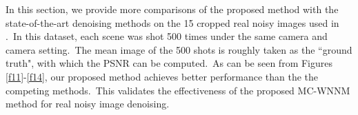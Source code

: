 \documentclass[10pt,onecolumn,letterpaper]{article}
\begin{document}
In this section, we provide more comparisons of the proposed method with the state-of-the-art denoising methods on the 15 cropped real noisy images used in \cite{crosschannel2016}.\ In this dataset, each scene was shot 500 times under the same camera and camera setting.\ The mean image of the 500 shots is roughly taken as the ``ground truth", with which the PSNR can be computed.\ As can be seen from Figures \ref{f11}-\ref{f14}, our proposed method achieves better performance than the the competing methods.\ This validates the effectiveness of the proposed MC-WNNM method for real noisy image denoising.


\begin{figure}[!htbp]
\centering
{}
\end{figure}
\end{document}
